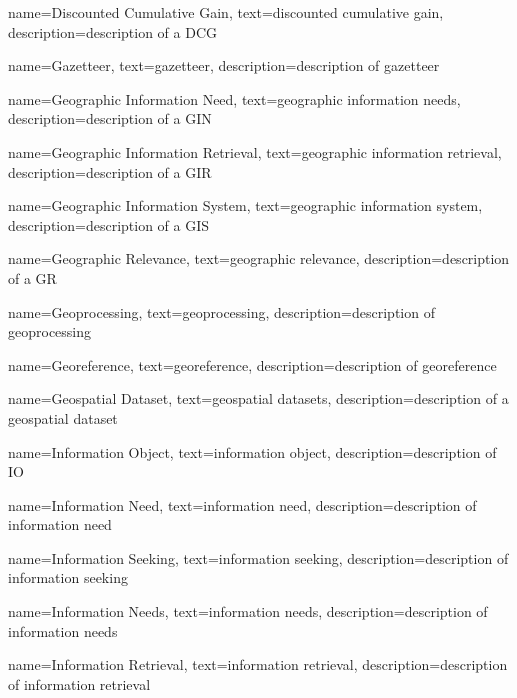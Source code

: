 
{
    name=Discounted Cumulative Gain,
    text=discounted cumulative gain,
    description=description of a DCG
}

{
    name=Gazetteer,
    text=gazetteer,
    description=description of gazetteer
}

{
    name=Geographic Information Need,
    text=geographic information needs,
    description=description of a GIN
}

{
    name=Geographic Information Retrieval,
    text=geographic information retrieval,
    description=description of a GIR
}

{
    name=Geographic Information System,
    text=geographic information system,
    description=description of a GIS
}

{
    name=Geographic Relevance,
    text=geographic relevance,
    description=description of a GR
}

{
    name=Geoprocessing,
    text=geoprocessing,
    description=description of geoprocessing
}

{
    name=Georeference,
    text=georeference,
    description=description of georeference
}

{
    name=Geospatial Dataset,
    text=geospatial datasets,
    description=description of a geospatial dataset
}

{
    name=Information Object,
    text=information object,
    description=description of IO
}

{
    name=Information Need,
    text=information need,
    description=description of information need
}

{
    name=Information Seeking,
    text=information seeking,
    description=description of information seeking
}

{
    name=Information Needs,
    text=information needs,
    description=description of information needs
}

{
    name=Information Retrieval,
    text=information retrieval,
    description=description of information retrieval
}

